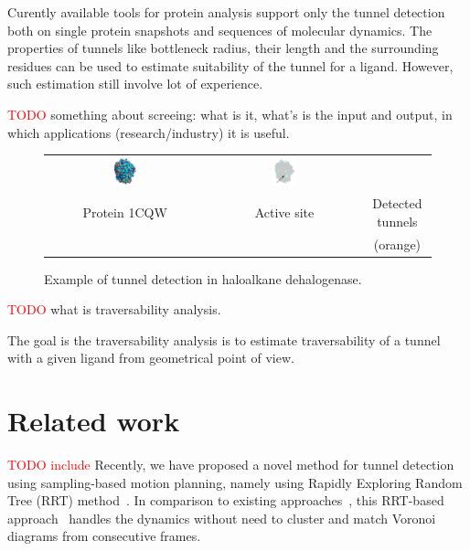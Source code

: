 \documentclass{llncs}
\newcommand{\red}[1]{\textcolor{red}{#1}}
\begin{document}
Curently available tools for protein analysis support only the tunnel detection both on single protein snapshots and sequences
of molecular dynamics.
The properties of tunnels like bottleneck radius, their length and the surrounding residues can be used
to estimate suitability of the tunnel for a ligand.
However, such estimation still involve lot of experience.

\red{TODO}
something about screeing: what is it, what's is the input and output, in which applications (research/industry) it is useful.





\begin{figure}[t]
\centering
{\footnotesize
\renewcommand{\arraystretch}{0.1}
\renewcommand{\tabcolsep}{0pt}
\begin{tabular}{ccc}
\includegraphics[width=0.15\textwidth]{fig/motiv1} &
\includegraphics[width=0.17\textwidth]{fig/motiv2lab} \\
Protein 1CQW & Active site & Detected tunnels \\
             &            & (orange)
\end{tabular}
}
\caption{\label{fig::motiv}
    Example of tunnel detection in haloalkane dehalogenase.
}
\end{figure}

\red{TODO}
what is traversability analysis.

The goal is the traversability analysis is to estimate traversability of a tunnel with a given ligand from geometrical point of view.




\section{Related work}

\red{TODO include}
Recently, we have proposed a novel method for tunnel detection using sampling-based motion planning, namely using Rapidly Exploring Random Tree (RRT) method~\cite{vonasek2016application}.
In comparison to existing approaches~\cite{Petrek20071357,citeulike:6257975}, this RRT-based approach~\cite{vonasek2016application} 
handles the dynamics without need to cluster and match Voronoi diagrams from consecutive frames.
\end{document}
